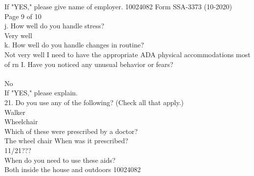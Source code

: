 \documentclass[12pt]{article}
\begin{document}
If "YES," please give name of employer.
10024082
Form SSA-3373 (10-2020)\\
Page 9 of 10\\
j. How well do you handle stress?\\
Very well\\
k. How well do you handle changes in routine?\\
Not very well I need to have the appropriate ADA physical accommodations most of rn
I. Have you noticed any unusual behavior or fears?\\
\\
No\\
If "YES," please explain.\\
21. Do you use any of the following? (Check all that apply.)\\
Walker\\
Wheelchair\\
Which of these were prescribed by a doctor?\\
The wheel chair
When was it prescribed?\\
11/21???
\\
When do you need to use these aids?\\
 Both inside the house and outdoors
10024082\\
\end{document}
